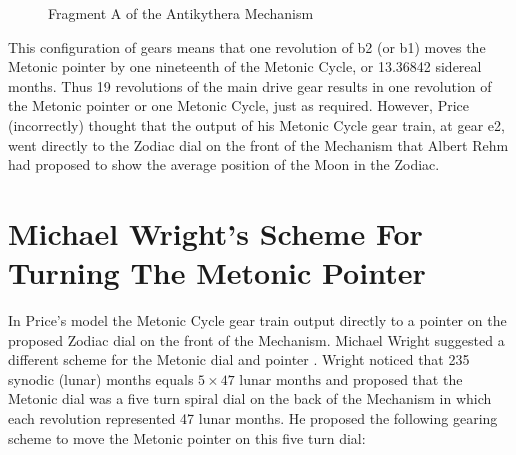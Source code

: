 \documentclass[11pt, oneside]{article}   	%
\theoremstyle{definition}
\begin{document}
\bigskip
\begin{figure}[H]
\caption{Fragment A of the Antikythera Mechanism \cite{wiki:fragmentA}}
\label{fig:fragmentA}
\end{figure}

\bigskip
\noindent
This configuration of gears means that one revolution of b2 (or b1) moves the Metonic pointer by one nineteenth of the Metonic Cycle, 
or 13.36842 sidereal months. Thus 19 revolutions of the main drive gear results in one revolution of the Metonic pointer or one Metonic Cycle, 
just as required. However, Price (incorrectly) thought that the output of his Metonic Cycle gear train, at gear e2,  went directly to the Zodiac dial 
on the front of the Mechanism that Albert Rehm \cite{wiki:rehm} had proposed to show the average position of the Moon in the Zodiac.

\section{Michael Wright's Scheme For Turning The Metonic Pointer}
In Price's model the Metonic Cycle gear train output directly to a pointer on the proposed Zodiac dial on the front of the Mechanism. Michael Wright suggested 
a different scheme for the Metonic dial and pointer \cite{Wright2005a}. Wright noticed that 235 synodic (lunar) months equals $5 \times 47 \text{ lunar months}$ 
and proposed that the Metonic dial was a five turn spiral dial on the back of the Mechanism in which each revolution represented 47 lunar months. He proposed 
the following gearing scheme to move the Metonic pointer on this five turn dial:
\end{document}
